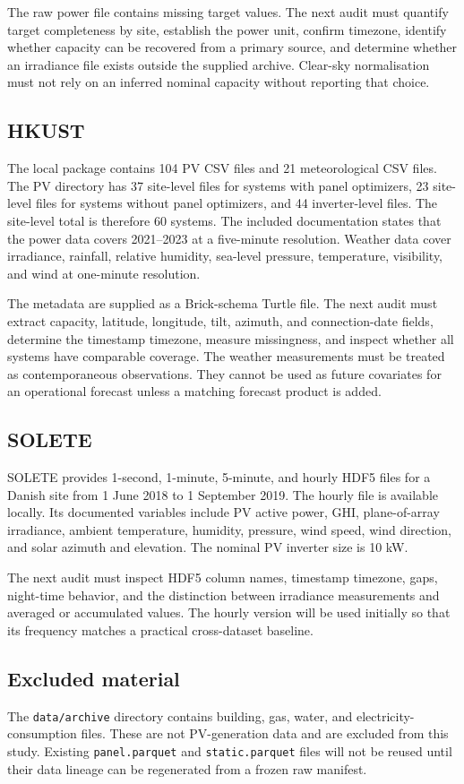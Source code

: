 The raw power file contains missing target values. The next audit must quantify target completeness by site, establish the power unit, confirm timezone, identify whether capacity can be recovered from a primary source, and determine whether an irradiance file exists outside the supplied archive. Clear-sky normalisation must not rely on an inferred nominal capacity without reporting that choice.

\subsection*{HKUST}

The local package contains 104 PV CSV files and 21 meteorological CSV files. The PV directory has 37 site-level files for systems with panel optimizers, 23 site-level files for systems without panel optimizers, and 44 inverter-level files. The site-level total is therefore 60 systems. The included documentation states that the power data covers 2021--2023 at a five-minute resolution. Weather data cover irradiance, rainfall, relative humidity, sea-level pressure, temperature, visibility, and wind at one-minute resolution.

The metadata are supplied as a Brick-schema Turtle file. The next audit must extract capacity, latitude, longitude, tilt, azimuth, and connection-date fields, determine the timestamp timezone, measure missingness, and inspect whether all systems have comparable coverage. The weather measurements must be treated as contemporaneous observations. They cannot be used as future covariates for an operational forecast unless a matching forecast product is added.

\subsection*{SOLETE}

SOLETE provides 1-second, 1-minute, 5-minute, and hourly HDF5 files for a Danish site from 1 June 2018 to 1 September 2019. The hourly file is available locally. Its documented variables include PV active power, GHI, plane-of-array irradiance, ambient temperature, humidity, pressure, wind speed, wind direction, and solar azimuth and elevation. The nominal PV inverter size is 10 kW.

The next audit must inspect HDF5 column names, timestamp timezone, gaps, night-time behavior, and the distinction between irradiance measurements and averaged or accumulated values. The hourly version will be used initially so that its frequency matches a practical cross-dataset baseline.

\subsection*{Excluded material}

The \texttt{data/archive} directory contains building, gas, water, and electricity-consumption files. These are not PV-generation data and are excluded from this study. Existing \texttt{panel.parquet} and \texttt{static.parquet} files will not be reused until their data lineage can be regenerated from a frozen raw manifest.
